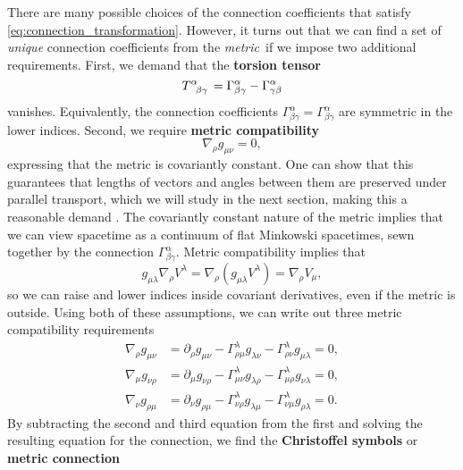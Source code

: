 There are many possible choices of the connection coefficients that satisfy \cref{eq:connection_transformation}.
However, it turns out that we can find a set of \emph{unique} connection coefficients from the \emph{metric} if we impose two additional requirements.
First, we demand that the \textbf{torsion tensor}
\begin{equation}
	T\indices{^\alpha_\beta_\gamma} = \Gamma^\alpha_{\beta\gamma} - \Gamma^\alpha_{\gamma\beta}
	\label{eq:torsion_tensor}
\end{equation}
vanishes.
Equivalently, the connection coefficients $ \Gamma^\alpha_{\beta\gamma} = \Gamma^\alpha_{\beta\gamma} $ are symmetric in the lower indices.
Second, we require \textbf{metric compatibility}
\begin{equation}
	\nabla_\rho g_{\mu \nu} = 0 ,
\end{equation}
expressing that the metric is covariantly constant.
One can show that this guarantees that lengths of vectors and angles between them are preserved under parallel transport, which we will study in the next section, making this a reasonable demand \cite[equation 2.10]{ref:hehl}.
The covariantly constant nature of the metric implies that we can view spacetime as a continuum of flat Minkowski spacetimes, sewn together by the connection $\Gamma^\alpha_{\beta \gamma}$.
Metric compatibility implies that
\begin{equation}
	g_{\mu \lambda} \nabla_\rho V^\lambda = \nabla_\rho (g_{\mu \lambda} V^\lambda) = \nabla_\rho V_\mu ,
\end{equation}
so we can raise and lower indices inside covariant derivatives, even if the metric is outside.
Using both of these assumptions, we can write out three metric compatibility requirements
\newcommand\metriccompatibilityequation[3]{\nabla_{#1} g_{{#2}{#3}} &= \partial_{#1} g_{{#2}{#3}} - \Gamma^\lambda_{{#1}{#2}} g_{\lambda {#3}} - \Gamma^\lambda_{{#1}{#3}} g_{{#2} \lambda} = 0}
\begin{subequations}
\begin{align}
	\metriccompatibilityequation{\rho}{\mu}{\nu} , \\
	\metriccompatibilityequation{\mu}{\nu}{\rho} , \\
	\metriccompatibilityequation{\nu}{\rho}{\mu} .
\end{align}
\end{subequations}
By subtracting the second and third equation from the first and solving the resulting equation for the connection, we find the \textbf{Christoffel symbols} or \textbf{metric connection}
